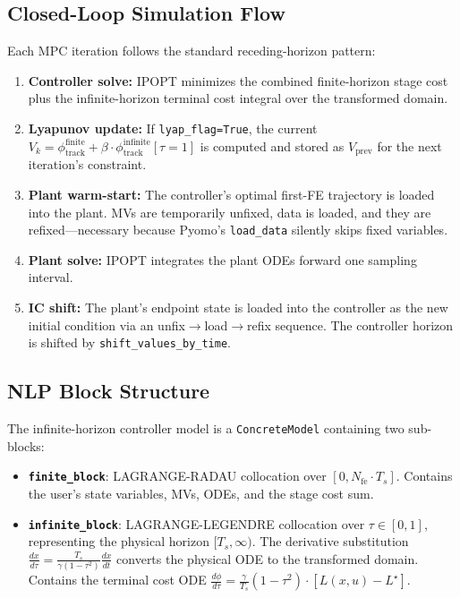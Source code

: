 \documentclass[11pt,letterpaper]{article}
\begin{document}
\subsection{Closed-Loop Simulation Flow}

Each MPC iteration follows the standard receding-horizon pattern:

\begin{enumerate}[leftmargin=2em]
  \item \textbf{Controller solve:} IPOPT minimizes the combined finite-horizon stage cost plus the infinite-horizon terminal cost integral over the transformed domain.
  \item \textbf{Lyapunov update:} If \texttt{lyap\_flag=True}, the current $V_k = \phi_\text{track}^{\text{finite}} + \beta \cdot \phi_\text{track}^{\text{infinite}}[\tau=1]$ is computed and stored as $V_\text{prev}$ for the next iteration's constraint.
  \item \textbf{Plant warm-start:} The controller's optimal first-FE trajectory is loaded into the plant. MVs are temporarily unfixed, data is loaded, and they are refixed---necessary because Pyomo's \texttt{load\_data} silently skips fixed variables.
  \item \textbf{Plant solve:} IPOPT integrates the plant ODEs forward one sampling interval.
  \item \textbf{IC shift:} The plant's endpoint state is loaded into the controller as the new initial condition via an unfix$\to$load$\to$refix sequence. The controller horizon is shifted by \texttt{shift\_values\_by\_time}.
\end{enumerate}

\subsection{NLP Block Structure}

The infinite-horizon controller model is a \texttt{ConcreteModel} containing two sub-blocks:

\begin{itemize}[leftmargin=2em]
  \item \textbf{\texttt{finite\_block}}: LAGRANGE-RADAU collocation over $[0, N_\text{fe} \cdot T_s]$. Contains the user's state variables, MVs, ODEs, and the stage cost sum.
  \item \textbf{\texttt{infinite\_block}}: LAGRANGE-LEGENDRE collocation over $\tau \in [0,1]$, representing the physical horizon $[T_s, \infty)$. The derivative substitution $\frac{dx}{d\tau} = \frac{T_s}{\gamma(1-\tau^2)}\frac{dx}{dt}$ converts the physical ODE to the transformed domain. Contains the terminal cost ODE $\frac{d\phi}{d\tau} = \frac{\gamma}{T_s}(1-\tau^2)\cdot[L(x,u) - L^\star]$.
\end{itemize}
\end{document}
